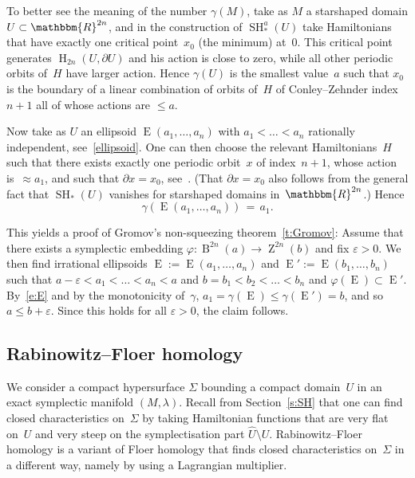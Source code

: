 \documentclass[12pt,twoside]{amsart}
\theoremstyle{plain}
\numberwithin{figure}{section}
\numberwithin{equation}{section}
\def\H{\operatorname{H}}
\def\SH{\operatorname{SH}}
\def\gg{\gamma}
\def\gve{\varepsilon}
\def\B{\operatorname{B}}
\def\E{\operatorname{E}}
\def\Z{\operatorname{Z}}
\def\RR{\mathbbm{R}}
\def\pp{\partial}
\begin{document}
To better see the meaning of the number $\gg (M)$, 
take as $M$ a starshaped domain $U \subset \RR^{2n}$,
and in the construction of $\SH_*^a (U)$ take Hamiltonians that have exactly one
critical point~$x_0$ (the minimum) at~$0$.
This critical point generates $\H_{2n} (U,\pp U)$ and his action is close to zero, 
while all other periodic orbits of~$H$ have larger action. 
Hence $\gg (U)$ is the smallest value~$a$
such that $x_0$ is the boundary of a linear combination of orbits of~$H$ 
of Conley--Zehnder index~$n+1$ all of whose actions are $\leqslant a$.

Now take as $U$ an ellipsoid $\E (a_1, \dots, a_n)$ with $a_1 < \dots < a_n$ rationally independent, 
see~\eqref{ellipsoid}.
One can then choose the relevant Hamiltonians~$H$ such that there exists exactly 
one periodic orbit~$x$ of index~$n+1$, whose action is~$\approx a_1$, and such that
$\pp x = x_0$, see~\cite{fhw94}. 
(That $\pp x = x_0$ also follows from the general fact that $\SH_*(U)$ 
vanishes for starshaped domains in~$\RR^{2n}$.)
%
Hence 
\begin{equation} \label{e:E}
\gg (\E (a_1, \dots, a_n)) \,=\, a_1 .
\end{equation}

This yields a proof of Gromov's non-squeezing theorem~\ref{t:Gromov}:
Assume that there exists a symplectic embedding $\varphi \colon \B^{2n}(a) \to \Z^{2n}(b)$
and fix $\gve >0$. We then find irrational ellipsoids $\E := \E(a_1, \dots, a_n)$ 
and $\E' := \E (b_1, \dots, b_n)$ such that
$a-\gve < a_1 < \dots < a_n < a$ and $b=b_1 < b_2 < \dots < b_n$ and
$\varphi (\E) \subset \E'$.
By~\eqref{e:E} and by the monotonicity of~$\gamma$, 
$a_1 = \gg (\E) \leqslant  \gg (\E') = b$, and so $a \leqslant b+\gve$.
Since this holds for all $\gve >0$, the claim follows.




\subsection{Rabinowitz--Floer homology}
\label{s:RF}

We consider a compact hypersurface $\Sigma$ bounding a compact domain~$U$ in an exact symplectic manifold 
$(M,\lambda)$.
%
Recall from Section~\ref{s:SH} that one can find closed characteristics
on~$\Sigma$ by taking Hamiltonian functions that are very flat on~$U$ and very steep on the symplectisation
part $\widehat U \setminus U$.
Rabinowitz--Floer homology is a variant of Floer homology that finds closed characteristics
on~$\Sigma$ in a different way, namely by using a Lagrangian multiplier.
\end{document}
